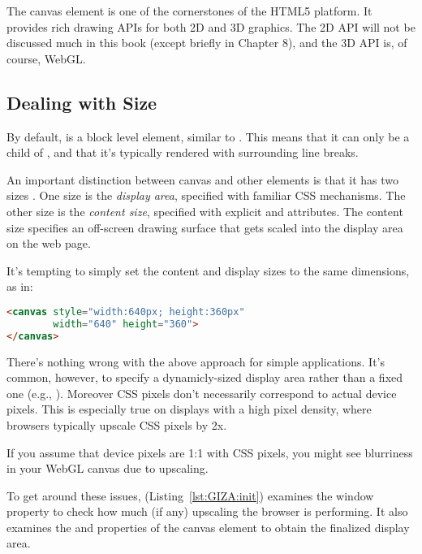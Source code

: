 The canvas element  is one of the cornerstones of the HTML5 platform.  It provides rich drawing APIs for both 2D and 3D graphics.  The 2D API will not be discussed much in this book (except briefly in Chapter 8), and the 3D API is, of course, WebGL.

\subsection{Dealing with Size}

By default,  is a block level element, similar to .  This means that it can only be a child of , and that it's typically rendered with surrounding line breaks.

An important distinction between canvas and other elements is that it has two sizes .  One size is the \emph{display area}, specified with familiar  CSS mechanisms.  The other size is the \emph{content size}, specified with explicit   and   attributes.  The content size specifies an off-screen drawing surface that gets scaled into the display area on the web page.

It's tempting to simply set the content and display sizes to the same dimensions, as in:

\begin{lstlisting}[language=HTML]
<canvas style="width:640px; height:360px"
        width="640" height="360">
</canvas>
\end{lstlisting}

There's nothing wrong with the above approach for simple applications.  It's common, however, to specify a dynamicly-sized display area rather than a fixed one (e.g., ).  Moreover CSS pixels don't necessarily correspond to actual device pixels.  This is especially true on displays with a high pixel density, where browsers typically upscale CSS pixels by 2x.

\begin{sidenote}
If you assume that device pixels are 1:1 with CSS pixels, you might see blurriness in your WebGL canvas due to upscaling.
\end{sidenote}

To get around these issues,   (Listing~\ref{lst:GIZA:init}) examines the  window property to check how much (if any) upscaling the browser is performing.  It also examines the   and  properties of the canvas element to obtain the finalized display area.

